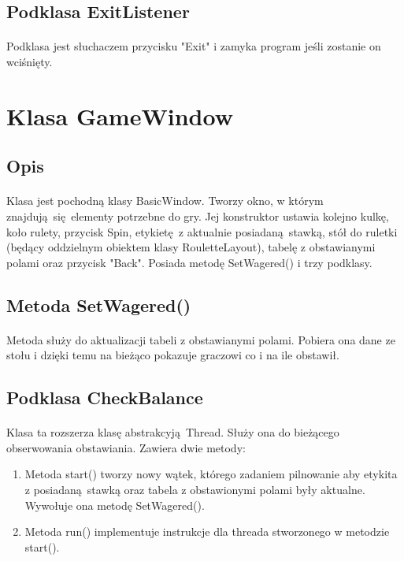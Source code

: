 \documentclass[11pt,a4paper]{article}
\begin{document}
\subsection{Podklasa ExitListener}
\paragraph{}
Podklasa jest słuchaczem przycisku "Exit" i zamyka program jeśli zostanie on wciśnięty.
\section{Klasa GameWindow}
\subsection{Opis}
\paragraph{}
Klasa jest pochodną klasy BasicWindow. Tworzy okno, w którym znajdują się elementy potrzebne do gry. Jej konstruktor ustawia kolejno kulkę, koło rulety, przycisk Spin, etykietę z aktualnie posiadaną stawką, stół do ruletki (będący oddzielnym obiektem klasy RouletteLayout), tabelę z obstawianymi polami oraz przycisk "Back". Posiada metodę SetWagered() i trzy podklasy.
\subsection{Metoda SetWagered()}
\paragraph{}
Metoda służy do aktualizacji tabeli z obstawianymi polami. Pobiera ona dane ze stołu i dzięki temu na bieżąco pokazuje graczowi co i na ile obstawił.
\subsection{Podklasa CheckBalance}
\paragraph{}
Klasa ta rozszerza klasę abstrakcyją Thread. Służy ona do bieżącego obserwowania obstawiania.
Zawiera dwie metody:
\begin{enumerate}
  \item Metoda start() tworzy nowy wątek, którego zadaniem pilnowanie aby etykita z posiadaną stawką oraz tabela z obstawionymi polami były aktualne. Wywołuje ona metodę SetWagered().
  \item Metoda run() implementuje instrukcje dla threada stworzonego w metodzie start().
\end{enumerate}
\end{document}
